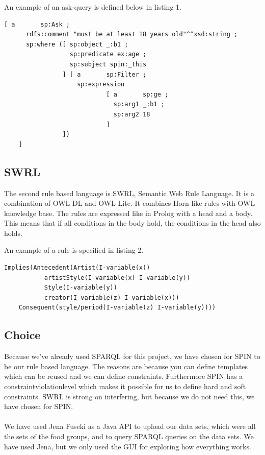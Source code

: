 An example of an ask-query is defined below in listing 1.

\begin{lstlisting}[caption={Example of query using SPIN}]
[ a       sp:Ask ;
      rdfs:comment "must be at least 18 years old"^^xsd:string ;
      sp:where ([ sp:object _:b1 ;
                  sp:predicate ex:age ;
                  sp:subject spin:_this
                ] [ a       sp:Filter ;
                    sp:expression
                            [ a       sp:ge ;
                              sp:arg1 _:b1 ;
                              sp:arg2 18
                            ]
                ])
    ]
\end{lstlisting}
\subsection*{SWRL}
The second rule based language is SWRL, Semantic Web Rule Language. It is a combination of OWL DL and OWL Lite. It combines Horn-like rules with OWL knowledge base. The rules are expressed like in Prolog with a head and a body. This means that if all conditions in the body hold, the conditions in the head also holds. 

An example of a rule is specified in listing 2.
\begin{lstlisting}[caption={Example of query using SWRL}]
Implies(Antecedent(Artist(I-variable(x)) 
		   artistStyle(I-variable(x) I-variable(y))
		   Style(I-variable(y))
		   creator(I-variable(z) I-variable(x)))
	Consequent(style/period(I-variable(z) I-variable(y))))
\end{lstlisting}

\subsection*{Choice}
Because we've already used SPARQL for this project, we have chosen for SPIN to be our rule based language. The reasons are because you can define templates which can be reused and we can define constraints. Furthermore SPIN has a constraintviolationlevel which makes it possible for us to define hard and soft constraints. SWRL is strong on interfering, but because we do not need this, we have chosen for SPIN.
\\ \\ 
We have used Jena Fuseki as a Java API to upload our data sets, which were all the sets of the food groups, and to query SPARQL queries on the data sets. We have used Jena, but we only used the GUI for exploring how everything works. 

